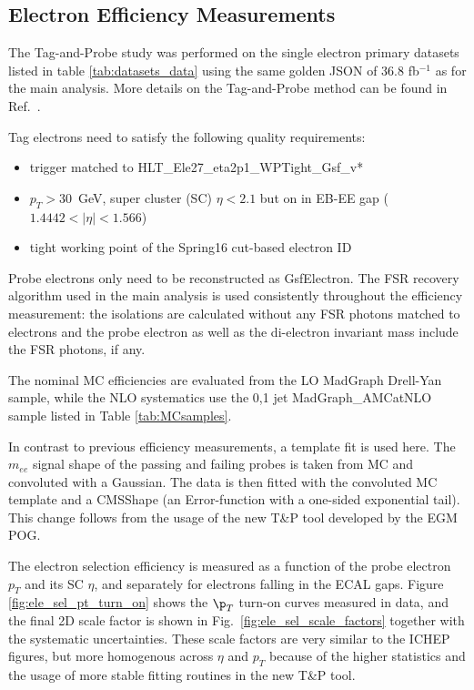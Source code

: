 \subsection{Electron Efficiency Measurements}
\label{sec:eleEffMeas}


The Tag-and-Probe study was performed on the single electron primary datasets listed in table \ref{tab:datasets_data} using the same golden JSON of 36.8 
fb$^{-1}$ as for the main analysis. More details on the Tag-and-Probe method can be found in Ref.~\cite{AN-15-277}. 

Tag electrons need to satisfy the following quality requirements:
\begin{itemize}
\item trigger matched to HLT\_Ele27\_eta2p1\_WPTight\_Gsf\_v*
\item $p_{T} > 30$~GeV, super cluster (SC) $\eta < 2.1$ but on in EB-EE gap ($1.4442<|\eta|<1.566$)
\item tight working point of the Spring16 cut-based electron ID
\end{itemize}

Probe electrons only need to be reconstructed as GsfElectron. The FSR recovery algorithm used in the main analysis is used consistently throughout the efficiency measurement: the isolations are calculated without any FSR photons matched to electrons and the probe electron \pt as well as the di-electron invariant mass include the FSR photons, if any. 


The nominal MC efficiencies are evaluated from the LO MadGraph Drell-Yan sample, while the NLO systematics use the 0,1 jet MadGraph\_AMCatNLO sample listed in Table \ref{tab:MCsamples}.

In contrast to previous efficiency measurements, a template fit is used here. The $m_{ee}$ signal shape of the passing and failing probes is taken from MC and convoluted with a Gaussian. The data is then fitted with the convoluted MC template and a CMSShape (an Error-function with a one-sided exponential tail). This change follows from the usage of the new T\&P tool developed by the EGM POG.



The electron selection efficiency is measured as a function of the probe electron $p_{T}$ and its SC $\eta$, and separately for electrons falling in the ECAL gaps. Figure \ref{fig:ele_sel_pt_turn_on} shows the $\p_{T}$ turn-on curves measured in data, and the final 2D scale factor is shown in Fig.~\ref{fig:ele_sel_scale_factors} together with the systematic uncertainties. These scale factors are very similar to the ICHEP figures, but more homogenous across $\eta$ and $p_{T}$ because of the higher statistics and the usage of more stable fitting routines in the new T\&P tool.


